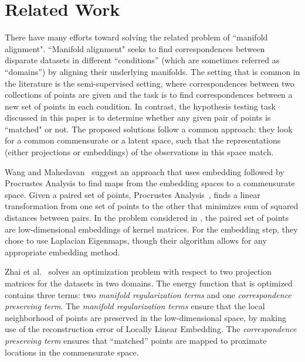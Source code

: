 \documentclass[12pt]{article} %
\begin{document}
\section{Related Work \label{sec:RelatedWork}}
There have many efforts toward solving the related problem of ``manifold alignment". ``Manifold alignment" seeks to find correspondences between disparate datasets in different ``conditions'' (which are  sometimes referred as ``domains'') by aligning their underlying manifolds. The setting that is common in the literature  is the semi-supervised setting\cite{Ham2005a}, where  correspondences between two collections of points  are given and the task is to find correspondences between a new set of points in each condition. In contrast, the hypothesis testing task discussed in this paper is to determine whether any given pair of points is ``matched" or not. The proposed solutions\cite{Wang2008,Zhai2010,3wayNMDS}
 follow a common approach: they look for a common commensurate or a latent space, such that the representations (either projections or embeddings) of the observations in this space match.

Wang and Mahedavan~\cite{Wang2008} suggest an  approach that uses embedding followed by Procrustes Analysis to find maps from the embedding spaces to a commensurate space. Given a paired set of points, Procrustes Analysis~\cite{Sibson}, finds a linear transformation from one set of points to the other that minimizes sum of squared distances between pairs. In the problem considered in \cite{Wang2008}, the paired set of points are low-dimensional embeddings of kernel matrices. For the embedding step, they chose to use Laplacian Eigenmaps, though their algorithm allows for any appropriate embedding method.

 Zhai et al.~\cite{Zhai2010}  solves an optimization problem  with respect to  two projection matrices for the datasets in two domains.  The energy function that is optimized contains three terms: two \emph{manifold regularization terms} and one \emph{correspondence preserving term}. The  \emph{manifold regularization terms} ensure that the local neighborhood of points are preserved in the low-dimensional space, by making use of the reconstruction error of Locally Linear Embedding.
The \emph{correspondence preserving term} ensures that ``matched'' points are mapped to proximate locations in the commensurate space.
\end{document}
